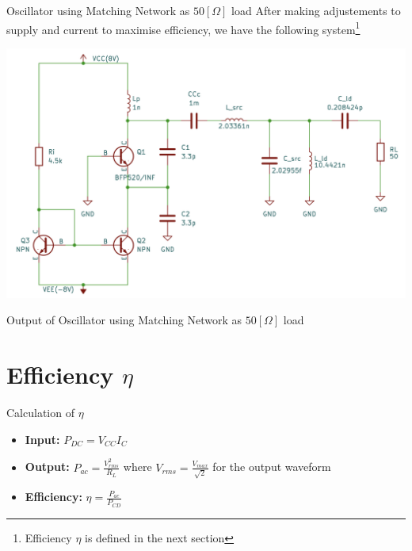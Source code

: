\documentclass{beamer}
\begin{document}
\begin{frame}{Oscillator using Matching Network as \(50[\Omega]\) load}
  After making adjustements to supply and current to maximise efficiency, we have the following system\footnote{Efficiency \(\eta\) is defined in the next section}
  \begin{center}
    \includegraphics[width=0.85\linewidth]{images/Full_system.png}
  \end{center}
\end{frame}


\begin{frame}{Output of Oscillator using Matching Network as \(50[\Omega]\) load}

\end{frame}


\section{Efficiency \(\eta\)}

\begin{frame}{Calculation of \(\eta\)}
\begin{itemize}
  \item <1-> \textbf{Input:} \(P_{DC} = V_{CC}I_C\)
  \item <2-> \textbf{Output:} \(P_{ac} = \frac{V_{rms}^2}{R_L}\) where \(V_{rms}=\frac{V_{max}}{\sqrt{2}}\) for the output waveform
  \item <3-> \textbf{Efficiency:} \(\eta=\frac{P_{ac}}{P_{CD}}\)
\end{itemize}

\end{frame}
\end{document}
